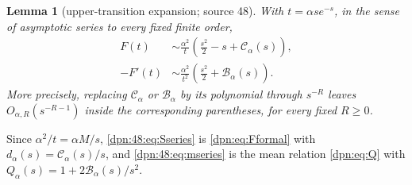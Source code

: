 \documentclass[11pt]{article}
\numberwithin{equation}{section}
\newtheorem{lemma}[theorem]{Lemma}
\theoremstyle{definition}\newtheorem{definition}[theorem]{Definition}
\theoremstyle{remark}\newtheorem{remark}[theorem]{Remark}
\newcommand{\Cop}{\mathcal C_\alpha}
\newcommand{\Bop}{\mathcal B_\alpha}
\begin{document}
\begin{lemma}[upper-transition expansion; source 48]\label{dpn:48:lem:sommerfeld}
With $t=\alpha se^{-s}$, in the sense of asymptotic series to every fixed
finite order,
\begin{align}
 F(t)&\sim\frac{\alpha^2}{t}
       \left(\frac{s^2}{2}-s+\Cop(s)\right),\label{dpn:48:eq:Sseries}\\
 -F'(t)&\sim\frac{\alpha^2}{t^2}
       \left(\frac{s^2}{2}+\Bop(s)\right).\label{dpn:48:eq:mseries}
\end{align}
More precisely, replacing $\Cop$ or $\Bop$ by its polynomial through $s^{-R}$
leaves $O_{\alpha,R}(s^{-R-1})$ inside the corresponding parentheses, for every
fixed $R\ge0$.
\end{lemma}
Since $\alpha^2/t=\alpha M/s$, \eqref{dpn:48:eq:Sseries} is
\eqref{dpn:eq:Fformal} with $d_\alpha(s)=\Cop(s)/s$, and
\eqref{dpn:48:eq:mseries} is the mean relation \eqref{dpn:eq:Q} with
$Q_\alpha(s)=1+2\Bop(s)/s^2$.
\end{document}

